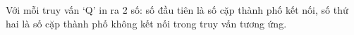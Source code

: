 Với mỗi truy vấn ‘Q’ in ra 2 số: số đầu tiên là số cặp thành phố kết nối, số thứ hai là số cặp thành phố không kết nối trong truy vấn tương ứng.

\